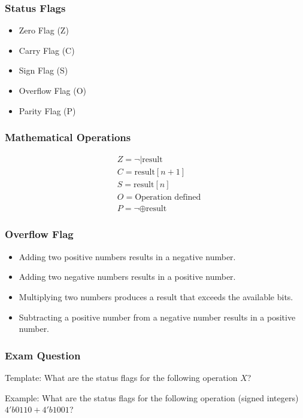 \begin{frame}
    \frametitle{Status Flags}
    \begin{itemize}
        \item Zero Flag (Z)
        \item Carry Flag (C)
        \item Sign Flag (S)
        \item Overflow Flag (O)
        \item Parity Flag (P)
    \end{itemize}
\end{frame}

\begin{frame}
    \frametitle{Mathematical Operations}
    \begin{equation}
        \begin{aligned}
            &Z = \neg | \text{result} \\ 
            &C = \text{result}[n+1] \\ 
            &S = \text{result}[n] \\ 
            &O = \text{Operation defined} \\ 
            &P = \neg \oplus \text{result} 
        \end{aligned}
    \end{equation}
\end{frame}

\begin{frame}
    \frametitle{Overflow Flag}
    \begin{itemize}
        \item Adding two positive numbers results in a negative number.
        \item Adding two negative numbers results in a positive number.
        \item Multiplying two numbers produces a result that exceeds the available bits.
        \item Subtracting a positive number from a negative number results in a positive number.
    \end{itemize}
\end{frame}

\begin{frame}
    \frametitle{Exam Question}
    Template: What are the status flags for the following operation \( X \)?

    Example: What are the status flags for the following operation (signed integers) \( 4'b0110 + 4'b1001 \)?
\end{frame}